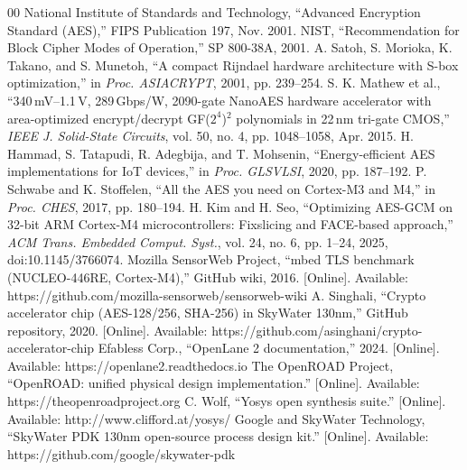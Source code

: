 \documentclass[conference]{IEEEtran}
\begin{document}

\begin{thebibliography}{00}
 National Institute of Standards and Technology,
``Advanced Encryption Standard (AES),'' FIPS Publication 197, Nov. 2001.
 NIST, ``Recommendation for Block Cipher Modes of
Operation,'' SP 800-38A, 2001.
 A. Satoh, S. Morioka, K. Takano, and S. Munetoh, ``A
compact Rijndael hardware architecture with S-box optimization,'' in
\emph{Proc. ASIACRYPT}, 2001, pp. 239--254.
 S. K. Mathew et al., ``340\,mV--1.1\,V, 289\,Gbps/W,
2090-gate NanoAES hardware accelerator with area-optimized encrypt/decrypt
GF($2^4$)$^2$ polynomials in 22\,nm tri-gate CMOS,'' \emph{IEEE J. Solid-State
Circuits}, vol. 50, no. 4, pp. 1048--1058, Apr. 2015.
 H. Hammad, S. Tatapudi, R. Adegbija, and T. Mohsenin,
``Energy-efficient AES implementations for IoT devices,'' in \emph{Proc.
GLSVLSI}, 2020, pp. 187--192.
 P. Schwabe and K. Stoffelen, ``All the AES you need on
Cortex-M3 and M4,'' in \emph{Proc. CHES}, 2017, pp. 180--194.
 H. Kim and H. Seo, ``Optimizing AES-GCM on 32-bit ARM
Cortex-M4 microcontrollers: Fixslicing and FACE-based approach,'' \emph{ACM
Trans. Embedded Comput. Syst.}, vol. 24, no. 6, pp. 1--24, 2025,
doi:10.1145/3766074.
 Mozilla SensorWeb Project, ``mbed TLS benchmark
(NUCLEO-446RE, Cortex-M4),'' GitHub wiki, 2016.
[Online]. Available: https://github.com/mozilla-sensorweb/sensorweb-wiki
 A. Singhali, ``Crypto accelerator chip (AES-128/256,
SHA-256) in SkyWater 130nm,'' GitHub repository, 2020. [Online]. Available:
https://github.com/asinghani/crypto-accelerator-chip
 Efabless Corp., ``OpenLane 2 documentation,''
2024. [Online]. Available: https://openlane2.readthedocs.io
 The OpenROAD Project, ``OpenROAD: unified physical design
implementation.'' [Online]. Available: https://theopenroadproject.org
 C. Wolf, ``Yosys open synthesis suite.''
[Online]. Available: http://www.clifford.at/yosys/
 Google and SkyWater Technology, ``SkyWater PDK 130nm
open-source process design kit.'' [Online]. Available:
https://github.com/google/skywater-pdk
\end{thebibliography}
\end{document}
